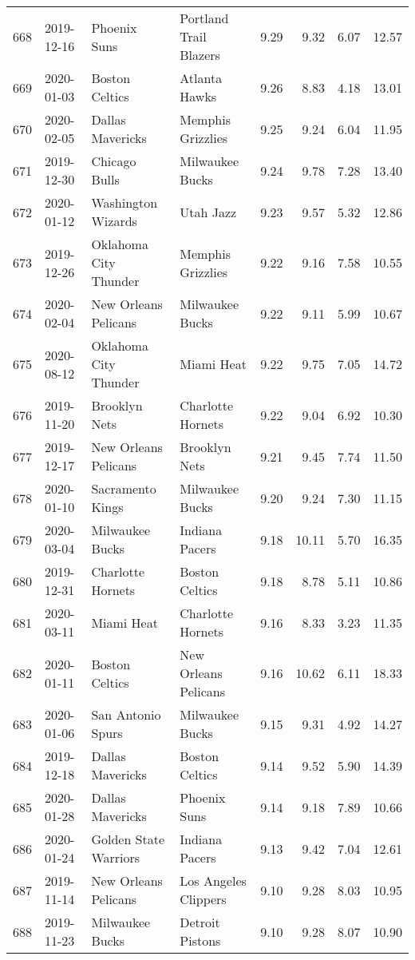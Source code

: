 \documentclass[
  11pt,
]{article}
\theoremstyle{nonumberplain}
\begin{document}
\begin{longtable}{rl|llr|rrr}
668 & 2019-12-16 & Phoenix Suns & Portland Trail Blazers & 9.29 & 9.32 & 6.07 & 12.57\\
669 & 2020-01-03 & Boston Celtics & Atlanta Hawks & 9.26 & 8.83 & 4.18 & 13.01\\
670 & 2020-02-05 & Dallas Mavericks & Memphis Grizzlies & 9.25 & 9.24 & 6.04 & 11.95\\
671 & 2019-12-30 & Chicago Bulls & Milwaukee Bucks & 9.24 & 9.78 & 7.28 & 13.40\\
672 & 2020-01-12 & Washington Wizards & Utah Jazz & 9.23 & 9.57 & 5.32 & 12.86\\
673 & 2019-12-26 & Oklahoma City Thunder & Memphis Grizzlies & 9.22 & 9.16 & 7.58 & 10.55\\
674 & 2020-02-04 & New Orleans Pelicans & Milwaukee Bucks & 9.22 & 9.11 & 5.99 & 10.67\\
675 & 2020-08-12 & Oklahoma City Thunder & Miami Heat & 9.22 & 9.75 & 7.05 & 14.72\\
676 & 2019-11-20 & Brooklyn Nets & Charlotte Hornets & 9.22 & 9.04 & 6.92 & 10.30\\
677 & 2019-12-17 & New Orleans Pelicans & Brooklyn Nets & 9.21 & 9.45 & 7.74 & 11.50\\
678 & 2020-01-10 & Sacramento Kings & Milwaukee Bucks & 9.20 & 9.24 & 7.30 & 11.15\\
679 & 2020-03-04 & Milwaukee Bucks & Indiana Pacers & 9.18 & 10.11 & 5.70 & 16.35\\
680 & 2019-12-31 & Charlotte Hornets & Boston Celtics & 9.18 & 8.78 & 5.11 & 10.86\\
681 & 2020-03-11 & Miami Heat & Charlotte Hornets & 9.16 & 8.33 & 3.23 & 11.35\\
682 & 2020-01-11 & Boston Celtics & New Orleans Pelicans & 9.16 & 10.62 & 6.11 & 18.33\\
683 & 2020-01-06 & San Antonio Spurs & Milwaukee Bucks & 9.15 & 9.31 & 4.92 & 14.27\\
684 & 2019-12-18 & Dallas Mavericks & Boston Celtics & 9.14 & 9.52 & 5.90 & 14.39\\
685 & 2020-01-28 & Dallas Mavericks & Phoenix Suns & 9.14 & 9.18 & 7.89 & 10.66\\
686 & 2020-01-24 & Golden State Warriors & Indiana Pacers & 9.13 & 9.42 & 7.04 & 12.61\\
687 & 2019-11-14 & New Orleans Pelicans & Los Angeles Clippers & 9.10 & 9.28 & 8.03 & 10.95\\
688 & 2019-11-23 & Milwaukee Bucks & Detroit Pistons & 9.10 & 9.28 & 8.07 & 10.90\\

\end{longtable}
\end{document}
